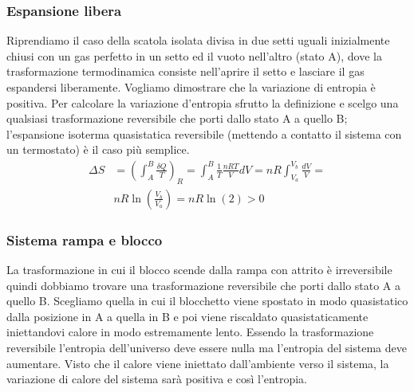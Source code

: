 \documentclass[10pt,a4paper]{article}
\begin{document}
\subsubsection*{Espansione libera}
Riprendiamo il caso della scatola isolata divisa in due setti uguali inizialmente chiusi con un gas perfetto in un setto ed il vuoto nell'altro (stato A), dove la trasformazione termodinamica consiste nell'aprire il setto e lasciare il gas espandersi liberamente. Vogliamo dimostrare che la variazione di entropia è positiva. Per calcolare la variazione d'entropia sfrutto la definizione e scelgo una qualsiasi trasformazione reversibile che porti dallo stato A a quello B; l'espansione isoterma quasistatica reversibile (mettendo a contatto il sistema con un termostato) è il caso più semplice.
\begin{align*}
	\Delta S &= \left(\int_{A}^{B}\frac{\delta Q}{T}\right)_R = \int_{A}^{B}\frac{1}{T}\frac{nRT}{V}dV =nR\int_{V_a}^{V_b}\frac{dV}{V} =\\
	&nR\ln\left(\frac{V_b}{V_a}\right)= nR\ln(2)>0
\end{align*}
\subsubsection*{Sistema rampa e blocco}
La trasformazione in cui il blocco scende dalla rampa con attrito è irreversibile quindi dobbiamo trovare una trasformazione reversibile che porti dallo stato A a quello B. Scegliamo quella in cui il blocchetto viene spostato in modo quasistatico dalla posizione in A a quella in B e poi viene riscaldato quasistaticamente iniettandovi calore in modo estremamente lento. Essendo la trasformazione reversibile l'entropia dell'universo deve essere nulla ma l'entropia del sistema deve aumentare. Visto che il calore viene iniettato dall'ambiente verso il sistema, la variazione di calore del sistema sarà positiva e così l'entropia. 
\end{document}
